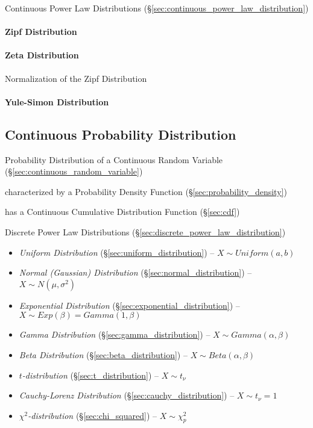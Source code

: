 \fist Continuous Power Law Distributions
(\S\ref{sec:continuous_power_law_distribution})



\paragraph{Zipf Distribution}\label{sec:zipf_distribution}\hfill

\paragraph{Zeta Distribution}\label{sec:zeta_distribution}\hfill

Normalization of the Zipf Distribution

\paragraph{Yule-Simon Distribution}
\label{sec:yule_simon_distribution}\hfill



\subsection{Continuous Probability Distribution}
\label{sec:continuous_probability}

Probability Distribution of a Continuous Random Variable
(\S\ref{sec:continuous_random_variable})

characterized by a Probability Density Function
(\S\ref{sec:probability_density})

has a Continuous Cumulative Distribution Function (\S\ref{sec:cdf})

\fist Discrete Power Law Distributions
(\S\ref{sec:discrete_power_law_distribution})

\begin{itemize}
  \item \emph{Uniform Distribution} (\S\ref{sec:uniform_distribution}) --
    $X \sim Uniform(a,b)$
  \item \emph{Normal (Gaussian) Distribution} (\S\ref{sec:normal_distribution})
    -- $X \sim N(\mu, \sigma^2)$
  \item \emph{Exponential Distribution} (\S\ref{sec:exponential_distribution})
    -- $X \sim Exp(\beta) = Gamma(1, \beta)$
  \item \emph{Gamma Distribution} (\S\ref{sec:gamma_distribution})
    -- $X \sim Gamma(\alpha, \beta)$
  \item \emph{Beta Distribution} (\S\ref{sec:beta_distribution})
    -- $X \sim Beta(\alpha, \beta)$
  \item \emph{$t$-distribution} (\S\ref{sec:t_distribution})
    -- $X \sim t_\nu$
  \item \emph{Cauchy-Lorenz Distribution} (\S\ref{sec:cauchy_distribution})
    -- $X \sim t_\nu=1$
  \item \emph{$\chi^2$-distribution} (\S\ref{sec:chi_squared})
    -- $X \sim \chi^2_p$
\end{itemize}



